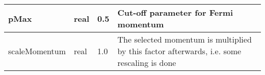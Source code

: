 \documentclass{article}
\begin{document}
\begin{longtable}{llll}
\midrule
pMax & \begin{minipage}[t]{2cm}real\end{minipage} & \begin{minipage}[t]{2cm}0.5\end{minipage} & \begin{minipage}[t]{12cm}Cut-off parameter for Fermi momentum\end{minipage}\\*
\midrule
scaleMomentum & \begin{minipage}[t]{2cm}real\end{minipage} & \begin{minipage}[t]{2cm}1.0\end{minipage} & \begin{minipage}[t]{12cm}The selected momentum is multiplied by this factor afterwards, i.e. some rescaling is done\end{minipage}\\*
\bottomrule
\end{longtable}
{ }



\end{document}
